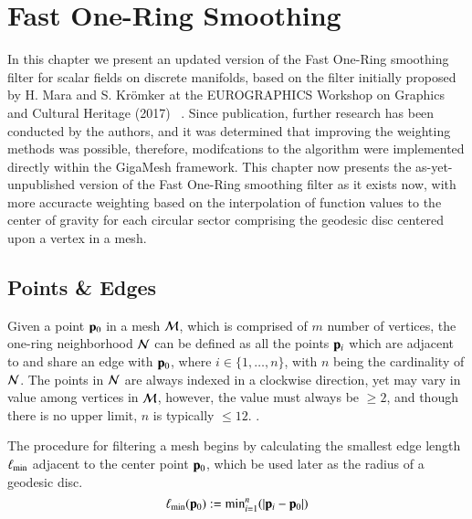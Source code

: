 \chapter{Fast One-Ring Smoothing}
\label{chFONS}
In this chapter we present an updated version of the Fast One-Ring smoothing filter for scalar fields on discrete manifolds, based on the filter initially proposed by H. Mara and S. Krömker at the EUROGRAPHICS Workshop on Graphics and Cultural Heritage (2017) ~\cite[s.~3.2]{Mara17}. Since publication, further research has been conducted by the authors, and it was determined that improving the weighting methods was possible, therefore, modifcations to the algorithm were implemented directly within the GigaMesh  framework. This chapter now presents the as-yet-unpublished version of the Fast One-Ring smoothing filter as it exists now, with more accuracte weighting based on the interpolation of function values to the center of gravity for each circular sector comprising the geodesic disc centered upon a vertex in a mesh.
%
%
%
%
%
\section{Points \& Edges}
\label{ch4sPE}
Given a point $\mathbf{p}_0$ in a mesh $\mathcal{M}$, which is comprised of $m$ number of vertices, the one-ring neighborhood $\mathcal{N}$ can be defined as all the points $\mathbf{p}_i$ which are adjacent to and share an edge with $\mathbf{p}_0$, where $i \in \{1, \ldots, n\}$, with $n$ being the cardinality of $\mathcal{N}$. The points in $\mathcal{N}$ are always indexed in a clockwise direction, yet may vary in value among vertices in $\mathcal{M}$, however, the value must always be $\geq 2$, and though there is no upper limit, $n$ is typically $\leq 12$.%
.%

The procedure for filtering a mesh begins by calculating the smallest edge length $\ell_\text{min}$ adjacent to the center point $\mathbf{p}_0$, which be used later as the radius of a geodesic disc.
\begin{equation}
	\ell_\text{min}(\mathbf{p}_0) := \text{min}^n_{i=1} (|\mathbf{p}_i - \mathbf{p}_0|)
	\label{eq:localMinimumEdgeLength}
\end{equation}%
%

